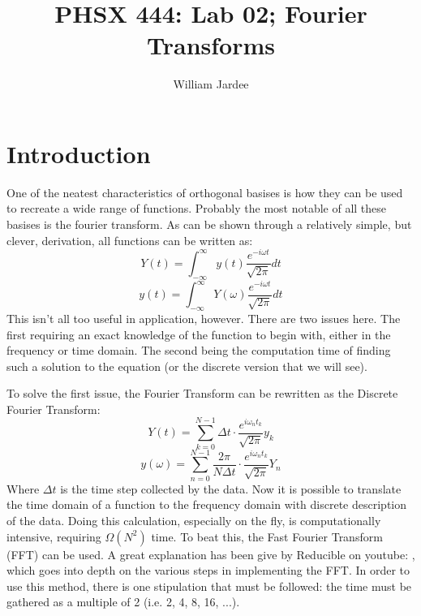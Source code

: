 \documentclass[12pt]{article}
\begin{document}
\title{PHSX 444: Lab 02; Fourier Transforms}
\author{William Jardee}
\maketitle

\section{Introduction}

One of the neatest characteristics of orthogonal basises is how they can be used to recreate a wide range of functions. Probably the most notable of all these basises is the fourier transform. As can be shown through a relatively simple, but clever, derivation, all functions can be written as:
\begin{equation*}
    Y(t) = \int^\infty_{-\infty} y(t) \frac{e^{-i\omega t}}{\sqrt{2\pi}} dt
    \label{eq:fourier_time}
\end{equation*}
\begin{equation*}
    y(t) = \int^\infty_{-\infty} Y(\omega) \frac{e^{-i\omega t}}{\sqrt{2\pi}} dt
    \label{eq:fourier_freq}
\end{equation*}
This isn't all too useful in application, however. There are two issues here. The first requiring an exact knowledge of the function to begin with, either in the frequency or time domain. The second being the computation time of finding such a solution to the equation (or the discrete version that we will see).

To solve the first issue, the Fourier Transform can be rewritten as the Discrete Fourier Transform:
\begin{equation*}
    Y(t) = \sum^{N-1}_{k=0} \Delta t \cdot \frac{e^{i \omega_n t_k}}{\sqrt{2\pi}} y_k 
\end{equation*}
\begin{equation*}
    y(\omega) = \sum^{N-1}_{n=0} \frac{2 \pi}{N \Delta t} \cdot \frac{e^{i \omega_n t_k}}{\sqrt{2\pi}} Y_n
\end{equation*}
Where $\Delta t$ is the time step collected by the data. Now it is possible to translate the time domain of a function to the frequency domain with discrete description of the data. Doing this calculation, especially on the fly, is computationally intensive, requiring $\Omega(N^2)$ time. To beat this, the Fast Fourier Transform (FFT) can be used. A great explanation has been give by Reducible on youtube: \cite{youtube}, which goes into depth on the various steps in implementing the FFT. In order to use this method, there is one stipulation that must be followed: the time must be gathered as a multiple of 2 (i.e. 2, 4, 8, 16, ...). 
\end{document}
